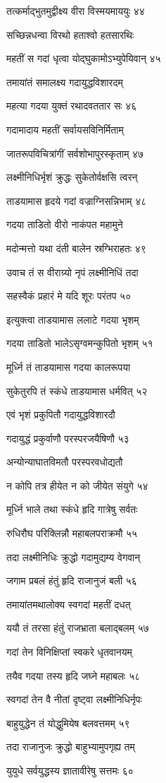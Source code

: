 तत्कर्माद्भुतमुद्वीक्ष्य वीरा विस्मयमाययुः ४४

सच्छिन्नधन्वा विरथो हताश्वो हतसारथिः

महतीं स गदां धृत्वा योद्घुकामोऽभ्युपेयिवान् ४५

तमायांतं समालक्ष्य गदायुद्धविशारदम्

महत्या गदया युक्तं रथादवततार सः ४६

गदामादाय महतीं सर्वायसविनिर्मिताम्

जातरूपविचित्रांगीं सर्वशोभापुरस्कृताम् ४७

लक्ष्मीनिधिर्भृशं क्रुद्धः सुकेतोर्वक्षसि त्वरन्

ताडयामास हृदये गदां वज्राग्निसन्निभाम् ४८

गदया ताडितो वीरो नाकंपत महामुने

मदोन्मत्तो यथा दंती बालेन स्रग्भिराहतः ४९

उवाच तं स वीराग्र्यो नृपं लक्ष्मीनिधिं तदा

सहस्वैकं प्रहारं मे यदि शूरः परंतप ५०

इत्युक्त्वा ताडयामास ललाटे गदया भृशम्

गदया ताडितो भालेऽसृग्वमन्कुपितो भृशम् ५१

मूर्ध्नि तं ताडयामास गदया कालरूपया

सुकेतुरपि तं स्कंधे ताडयामास धर्मवित् ५२

एवं भृशं प्रकुपितौ गदायुद्धविशारदौ

गदायुद्धं प्रकुर्वाणौ परस्परजयैषिणौ ५३

अन्योन्याघातविमतौ परस्परवधोद्यतौ

न कोपि तत्र हीयेत न को जीयेत संयुगे ५४

मूर्ध्नि भाले तथा स्कंधे हृदि गात्रेषु सर्वतः

रुधिरौघ परिक्लिन्नौ महाबलपराक्रमौ ५५

तदा लक्ष्मीनिधिः क्रुद्धो गदामुद्यम्य वेगवान्

जगाम प्रबलं हंतुं हृदि राजानुजं बली ५६

तमायांतमथालोक्य स्वगदां महतीं दधत्

ययौ तं तरसा हंतुं राजभ्राता बलाद्बलम् ५७

गदां तेन विनिक्षिप्तां स्वकरे धृतवानयम्

तयैव गदया तस्य हृदि जघ्ने महाबलः ५८

स्वगदां तेन वै नीतां दृष्ट्वा लक्ष्मीनिधिर्नृपः

बाहुयुद्धेन तं योद्धुमियेष बलवत्तमम् ५९

तदा राजानुजः क्रुद्धो बाहुभ्यामुपगृह्य तम्

युयुधे सर्वयुद्धस्य ज्ञातावीरेषु सत्तमः ६०

